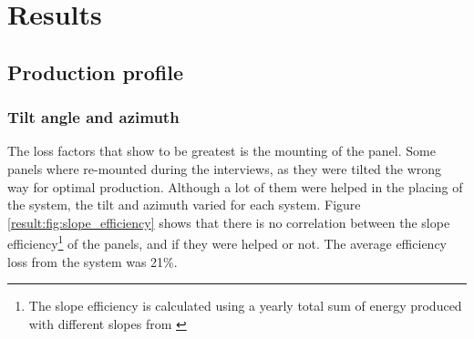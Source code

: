 
\chapter{Results}
\label{ch:results}

\section{Production profile}


\subsection{Tilt angle and azimuth}
The loss factors that show to be greatest is the mounting of the panel. Some panels where re-mounted during the interviews, as they were tilted the wrong way for optimal production. Although a lot of them were helped in the placing of the system, the tilt and azimuth varied for each system. Figure \ref{result:fig:slope_efficiency} shows that there is no correlation between the slope efficiency\footnote{The slope efficiency is calculated using a yearly total sum of energy produced with different slopes from \citep{huldNewSolarRadiation2012}} of the panels, and if they were helped or not. The average efficiency loss from the system was 21\%. 

